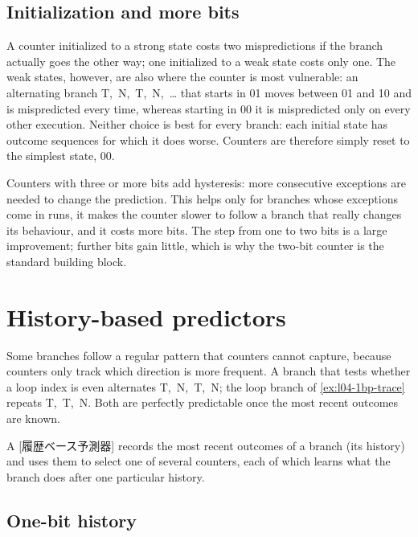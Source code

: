 \documentclass[../main.tex]{subfiles}
\begin{document}
\subsection{Initialization and more bits}

A counter initialized to a strong state costs two mispredictions if the
branch actually goes the other way; one initialized to a weak state costs
only one.  The weak states, however, are also where the counter is most
vulnerable: an alternating branch T,~N,~T,~N,~\ldots{} that starts in 01
moves between 01 and 10 and is mispredicted every time, whereas starting in
00 it is mispredicted only on every other execution.  Neither choice is
best for every branch: each initial state has outcome sequences for which it
does worse.  Counters are therefore simply reset to the simplest state,
00.

Counters with three or more bits add hysteresis: more consecutive exceptions
are needed to change the prediction.  This helps only for branches whose
exceptions come in runs, it makes the counter slower to follow a branch that
really changes its behaviour, and it costs more bits.  The step from one to
two bits is a large improvement; further bits gain little, which is why the
two-bit counter is the standard building block.

\section{History-based predictors}
\label{sec:l04-history}

Some branches follow a regular pattern that counters cannot capture, because
counters only track which direction is more frequent.  A branch that tests whether a loop index
is even alternates T,~N,~T,~N; the loop branch of \cref{ex:l04-1bp-trace}
repeats T,~T,~N.  Both are perfectly predictable once the most recent
outcomes are known.

\begin{definition}
  A [履歴ベース予測器] records the most recent
  outcomes of a branch (its history) and uses them to select one of several
  counters, each of which learns what the branch does after one particular
  history.
\end{definition}

\subsection{One-bit history}
\end{document}
